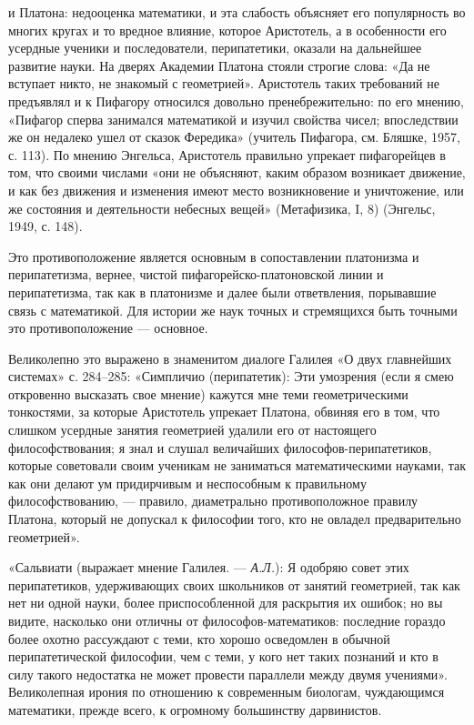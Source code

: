 и  Платона:  недооценка  математики,  и  эта  слабость  объясняет  его
популярность  во   многих  кругах   и  то  вредное   влияние,  которое
Аристотель,  а в  особенности  его усердные  ученики и  последователи,
перипатетики, оказали на дальнейшее развитие науки. На дверях Академии
Платона стояли  строгие слова:  «Да не вступает  никто, не  знакомый с
геометрией». Аристотель  таких требований  не предъявлял и  к Пифагору
относился довольно  пренебрежительно: по  его мнению,  «Пифагор сперва
занимался  математикой и  изучил  свойства чисел;  впоследствии же  он
недалеко  ушел  от сказок  Фередика»  (учитель  Пифагора, см.  Бляшке,
1957,  с.  113). По  мнению  Энгельса,  Аристотель правильно  упрекает
пифагорейцев  в  том, что  своими  числами  «они не  объясняют,  каким
образом возникает движение, и как без движения и изменения имеют место
возникновение и уничтожение, или  же состояния и деятельности небесных
вещей» (Метафизика, I, 8) (Энгельс, 1949, с. 148).

Это  противоположение  является  основным в  сопоставлении  платонизма
и  перипатетизма,  вернее,  чистой пифагорейско-платоновской  линии  и
перипатетизма,  так  как  в   платонизме  и  далее  были  ответвления,
порывавшие  связь  с  математикой.  Для   истории  же  наук  точных  и
стремящихся быть точными это противоположение --- основное.

Великолепно  это  выражено  в   знаменитом  диалоге  Галилея  «О  двух
главнейших  системах»  с.   284--285:  «Симпличио  (перипатетик):  Эти
умозрения  (если  я смею  откровенно  высказать  свое мнение)  кажутся
мне теми  геометрическими тонкостями,  за которые  Аристотель упрекает
Платона, обвиняя  его в том,  что слишком усердные  занятия геометрией
удалили  его   от  настоящего   философствования;  я  знал   и  слушал
величайших философов-перипатетиков, которые  советовали своим ученикам
не  заниматься   математическими  науками,  так  как   они  делают  ум
придирчивым и неспособным к правильному философствованию, --- правило,
диаметрально противоположное  правилу Платона,  который не  допускал к
философии того, кто не овладел предварительно геометрией».

«Сальвиати  (выражает  мнение  Галилея. ---  \emph{А.Л.}):  Я  одобряю
совет  этих перипатетиков,  удерживающих своих  школьников от  занятий
геометрией,  так  как  нет   ни  одной  науки,  более  приспособленной
для  раскрытия их  ошибок;  но  вы видите,  насколько  они отличны  от
философов-математиков:  последние гораздо  более  охотно рассуждают  с
теми, кто хорошо осведомлен  в обычной перипатетической философии, чем
с теми, у  кого нет таких познаний  и кто в силу  такого недостатка не
может провести параллели между двумя учениями». Великолепная ирония по
отношению  к  современным  биологам,  чуждающимся  математики,  прежде
всего, к огромному большинству дарвинистов.


